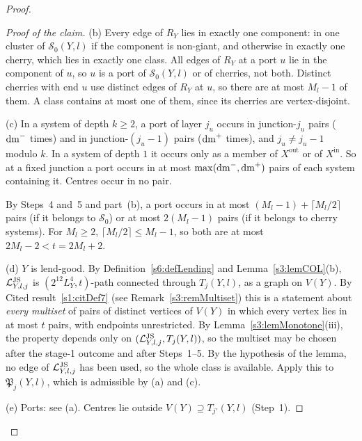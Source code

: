 \begin{proof}
\begin{proof}[Proof of the claim]
(b) Every edge of $R_Y$ lies in exactly one component: in one cluster of $\mathcal S_0(Y,l)$ if the component is non-giant, and otherwise in exactly one cherry, which lies in exactly one class. All edges of $R_Y$ at a port $u$ lie in the component of $u$, so $u$ is a port of $\mathcal S_0(Y,l)$ or of cherries, not both. Distinct cherries with end $u$ use distinct edges of $R_Y$ at $u$, so there are at most $M_l-1$ of them. A class contains at most one of them, since its cherries are vertex-disjoint.

(c) In a system of depth $k\ge2$, a port of layer $j_u$ occurs in junction-$j_u$ pairs ($\mathrm{dm}^-$ times) and in junction-$(j_u-1)$ pairs ($\mathrm{dm}^+$ times), and $j_u\neq j_u-1$ modulo $k$. In a system of depth $1$ it occurs only as a member of $X^{\mathrm{out}}$ or of $X^{\mathrm{in}}$. So at a fixed junction a port occurs in at most $\max(\mathrm{dm}^-,\mathrm{dm}^+)$ pairs of each system containing it. Centres occur in no pair.

By Steps~4 and~5 and part~(b), a port occurs in at most $(M_l-1)+\lceil M_l/2\rceil$ pairs (if it belongs to $\mathcal S_0$) or at most $2(M_l-1)$ pairs (if it belongs to cherry systems). For $M_l\ge2$, $\lceil M_l/2\rceil\le M_l-1$, so both are at most $2M_l-2<t=2M_l+2$.

(d) $Y$ is lend-good. By Definition~\ref{s6:defLending} and Lemma~\ref{s3:lemCOL}(b), $\mathcal{L}^{\mathrm{JS}}_{Y,l,j}$ is $(2^{12}L_Y^4,t)$-path connected through $T_j(Y,l)$, as a graph on $V(Y)$. By Cited result~\ref{s1:citDef7} (see Remark~\ref{s3:remMultiset}) this is a statement about \emph{every multiset} of pairs of distinct vertices of $V(Y)$ in which every vertex lies in at most $t$ pairs, with endpoints unrestricted. By Lemma~\ref{s3:lemMonotone}(iii), the property depends only on $(\mathcal{L}^{\mathrm{JS}}_{Y,l,j},T_j(Y,l))$, so the multiset may be chosen after the stage-1 outcome and after Steps~1--5. By the hypothesis of the lemma, no edge of $\mathcal{L}^{\mathrm{JS}}_{Y,l,j}$ has been used, so the whole class is available. Apply this to $\mathfrak P_j(Y,l)$, which is admissible by (a) and (c).

(e) Ports: see (a). Centres lie outside $V(Y)\supseteq T_{j'}(Y,l)$ (Step~1).
\end{proof}


\end{proof}
